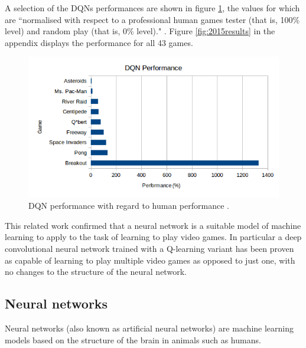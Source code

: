 \documentclass[10pt]{article}
\begin{document}
		 A selection of the DQNs performances are shown in figure \ref{fig:performance}, the values for which are ``normalised with respect to a professional human games tester (that is, 100\% level) and random play (that is, 0\% level)." \cite{humanlevel}. Figure \ref{fig:2015results} in the appendix displays the performance for all 43 games.
		
		\begin{figure}[h]				
			\includegraphics[scale=0.7]{img/deepMindPerformance}
			\centering
			\caption{DQN performance with regard to human performance \cite{humanlevel}.}
			\label{fig:performance}
		\end{figure}
		
		This related work confirmed that a neural network is a suitable model of machine learning to apply to the task of learning to play video games. In particular a deep convolutional neural network trained with a Q-learning variant has been proven as capable of learning to play multiple video games as opposed to just one, with no changes to the structure of the neural network.\\
		
	\medskip
	\subsection{Neural networks}
		Neural networks (also known as artificial neural networks) are machine learning models based on the structure of the brain in animals such as humans.\\
		
\end{document}
